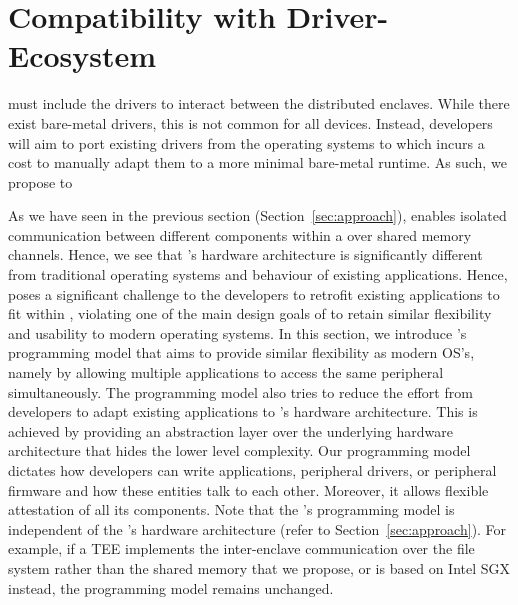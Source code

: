 \section{Compatibility with Driver-Ecosystem}
\label{sec:programmingModel}



\Nameenclave{} must include the drivers to interact between the distributed enclaves. While there exist bare-metal drivers, this is not common for all devices. Instead, developers will aim to port existing drivers from the operating systems to \name{} which incurs a cost to manually adapt them to a more minimal bare-metal runtime. As such, we propose to 

As we have seen in the previous section (Section~\ref{sec:approach}), \name enables isolated communication between different components within a \nameenclave over shared memory channels. Hence, we see that \name{}'s hardware architecture is significantly different from traditional operating systems and behaviour of existing applications. Hence, \name poses a significant challenge to the developers to retrofit existing applications to fit within \name{}, violating one of the main design goals of \name to retain similar flexibility and usability to modern operating systems. In this section, we introduce \name{}'s programming model that aims to provide similar flexibility as modern OS's, namely by allowing multiple applications to access the same peripheral simultaneously. The programming model also tries to reduce the effort from developers to adapt existing applications to \name{}'s hardware architecture. This is achieved by providing an abstraction layer over the underlying hardware architecture that hides the lower level complexity. Our programming model dictates how developers can write applications, peripheral drivers, or peripheral firmware and how these entities talk to each other. Moreover, it allows flexible attestation of all its components. Note that the \name{}'s programming model is independent of the \name{}'s hardware architecture (refer to Section~\ref{sec:approach}). For example, if a TEE implements the inter-enclave communication over the file system rather than the shared memory that we propose, or is based on Intel SGX instead, the programming model remains unchanged.

